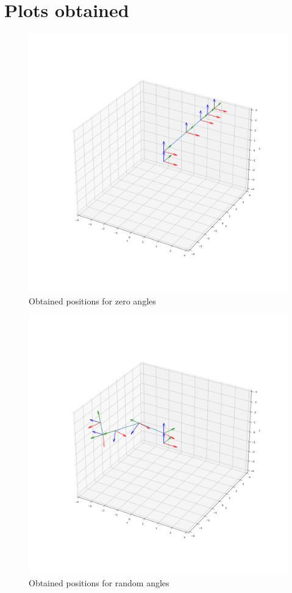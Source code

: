 
\section*{Plots obtained}

\begin{figure}[!ht]
    \centering
    \includegraphics[width=\linewidth]{forward_zeros}
    \caption{Obtained positions for zero angles}
    \label{fig:figure1}
\end{figure}

\begin{figure}[!ht]
    \centering
    \includegraphics[width=\linewidth]{forward_random}
    \caption{Obtained positions for random angles}
    \label{fig:figure2}
\end{figure}

